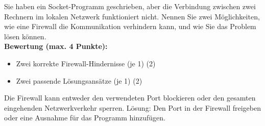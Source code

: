 \begin{myexercise}

    Sie haben ein Socket-Programm geschrieben, aber die Verbindung zwischen zwei Rechnern im lokalen Netzwerk funktioniert nicht. Nennen Sie zwei Möglichkeiten, wie eine Firewall die Kommunikation verhindern kann, und wie Sie das Problem lösen können.
    \\[.5cm]
    \textbf{Bewertung (max. 4 Punkte):}
    \begin{itemize}
        \item Zwei korrekte Firewall-Hindernisse (je 1) (2)
        \item Zwei passende Lösungsansätze (je 1) (2)
    \end{itemize}

    \begin{myanswer}
        Die Firewall kann entweder den verwendeten Port blockieren oder den gesamten eingehenden Netzwerkverkehr sperren. Lösung: Den Port in der Firewall freigeben oder eine Ausnahme für das Programm hinzufügen.
    \end{myanswer}
\end{myexercise}

